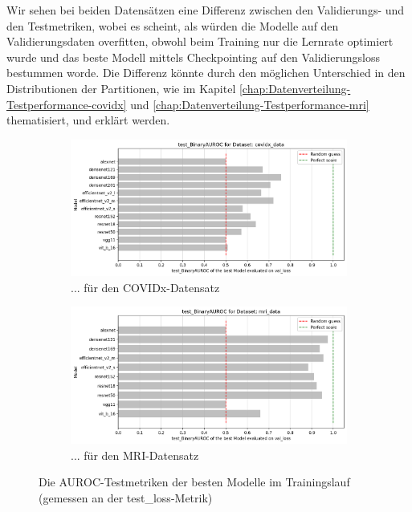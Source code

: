 Wir sehen bei beiden Datensätzen eine Differenz zwischen den Validierungs- und den Testmetriken, wobei es scheint, als würden die Modelle auf den Validierungsdaten overfitten, obwohl beim Training nur die Lernrate optimiert wurde und das beste Modell mittels Checkpointing auf den Validierungsloss bestummen worde. Die Differenz könnte durch den möglichen Unterschied in den Distributionen der Partitionen, wie im Kapitel
\ref{chap:Datenverteilung-Testperformance-covidx}
und \ref{chap:Datenverteilung-Testperformance-mri} thematisiert, und erklärt werden.

\begin{figure}[ht!]
    \centering
    \begin{subfigure}{0.5\linewidth}
        \centering
        \includegraphics[height=0.5\linewidth]{01-images/05-resultate/test_binaryAUROC_COVIDX.png}
        \caption{...  für den COVIDx-Datensatz}
    \end{subfigure}\hfill%
    \begin{subfigure}{0.5\linewidth}
        \centering
        \includegraphics[height=0.5\linewidth]{01-images/05-resultate/test_binaryAUROC_MRI.png}
        \caption{... für den MRI-Datensatz}
    \end{subfigure}
    \caption{Die AUROC-Testmetriken der besten Modelle im Trainingslauf (gemessen an der test\_loss-Metrik)}
\end{figure}

